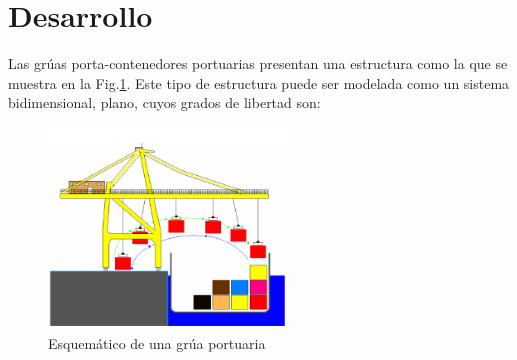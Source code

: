 \documentclass[journal]{IEEEtran}
\begin{document}
%




\section{Desarrollo}

Las grúas porta-contenedores portuarias presentan 
una estructura como la que se muestra en la Fig.\ref{fig:grua}.
Este tipo de estructura puede ser modelada como un sistema 
bidimensional, plano, cuyos grados de libertad son:

\begin{figure}[!t]
  \centering
  \includegraphics[width=2.5in]{esquema_grua.png}
  \caption{Esquemático de una grúa portuaria}
  \label{fig:grua}
\end{figure}
\end{document}
